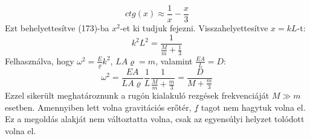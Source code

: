 \documentclass[a4paper,12pt]{article}
\begin{document}
\begin{equation}
ctg(x)\approx\frac{1}{x}-\frac{x}{3}
\end{equation}
Ezt behelyettesítve (173)-ba $x^2$-et ki tudjuk fejezni. Visszahelyettesítve $x=kL$-t:
\begin{equation}
k^2L^2=\frac{1}{\frac{M}{m}+\frac{1}{3}}
\end{equation}
Felhasználva, hogy $\omega^2=\frac{E}{\varrho}k^2$, $LA\varrho=m$, valamint $\frac{EA}{L}=D$:
\begin{equation}
\omega^2=\frac{EA}{LA\varrho}\frac{1}{L}\frac{1}{\frac{M}{m}+\frac{m}{3}}=\frac{D}{M+\frac{m}{3}}
\end{equation}
Ezzel sikerült meghatároznunk a rugón kialakuló rezgések frekvenciáját $M \gg m$ esetben.
Amennyiben lett volna gravitációs erőtér, $\underline{f}$ tagot nem hagytuk volna el. Ez a megoldás alakját nem változtatta volna, csak az egyensúlyi helyzet tolódott volna el.
\end{document}
